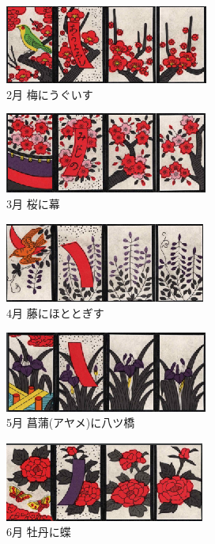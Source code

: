 \documentclass[a4j]{jarticle}
\begin{document}
    \begin{figure}[H]
    \centering
    \includegraphics[scale=1.5]{./img/feb.eps}
    \caption{2月 梅にうぐいす}
    \label{feb}
    \end{figure}

    \begin{figure}[H]
    \centering
    \includegraphics[scale=1.5]{./img/mar.eps}
    \caption{3月 桜に幕}
    \label{mar}
    \end{figure}

    \begin{figure}[H]
      \centering
      \includegraphics[scale=1.5]{./img/apr.eps}
      \caption{4月 藤にほととぎす}
      \label{apr}
      \end{figure}
  
      \begin{figure}[H]
      \centering
      \includegraphics[scale=1.5]{./img/may.eps}
      \caption{5月 菖蒲(アヤメ)に八ツ橋}
      \label{may}
      \end{figure}
  
      \begin{figure}[H]
      \centering
      \includegraphics[scale=1.5]{./img/jun.eps}
      \caption{6月 牡丹に蝶}
      \label{jun}
    \end{figure}
\end{document}
